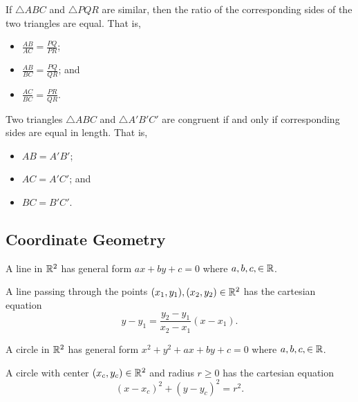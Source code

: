 \newpage

\begin{proposition}
    If $\triangle ABC$ and $\triangle PQR$ are similar, then the ratio of the corresponding sides of the two triangles are equal. That is,
    \begin{itemize}
        \item $\frac{AB}{AC} = \frac{PQ}{PR}$;
        \item $\frac{AB}{BC} = \frac{PQ}{QR}$; and
        \item $\frac{AC}{BC} = \frac{PR}{QR}$.
    \end{itemize}
\end{proposition}

\begin{definition}
    Two triangles $\triangle ABC$ and $\triangle A'B'C'$ are congruent if and only if corresponding sides are equal in length. That is,
    \begin{itemize}
        \item $AB = A'B'$;
        \item $AC = A'C'$; and
        \item $BC = B'C'$.
    \end{itemize}
\end{definition}

\subsection{Coordinate Geometry}
\begin{definition}
    A line in $\mathbb{R}^2$ has general form $ax + by + c = 0$ where $a,b,c, \in \mathbb{R}$.
\end{definition}

\begin{proposition}
    A line passing through the points $(x_1, y_1), (x_2, y_2) \in \mathbb{R}^2$ has the cartesian equation
    \[
        y - y_1 = \frac{y_2-y_1}{x_2-x_1}(x - x_1).
    \]
\end{proposition}

\begin{definition}
    A circle in $\mathbb{R}^2$ has general form $x^2 + y^2 + ax + by + c = 0$ where $a,b,c, \in \mathbb{R}$.
\end{definition}

\begin{proposition}
    A circle with center $(x_c, y_c) \in \mathbb{R}^2$ and radius $r \geq 0$ has the cartesian equation
    \[
        (x-x_c)^2 + (y-y_c)^2 = r^2.
    \]
\end{proposition}

